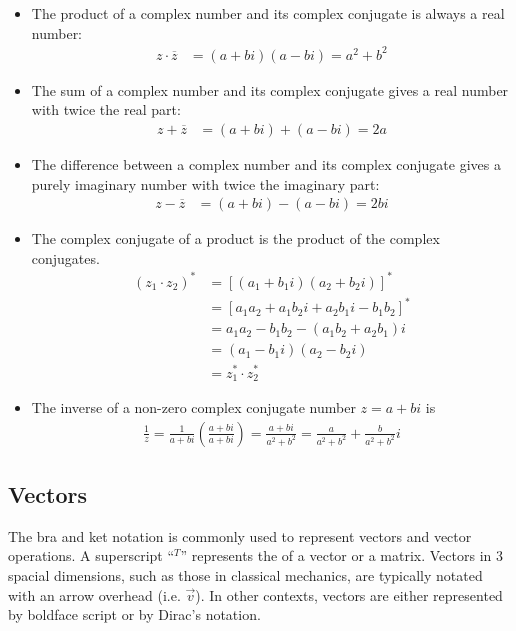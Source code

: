 \begin{itemize}
	\item The product of a complex number and its complex conjugate is always a real number:
	\begin{align}
		z \cdot \overline{z} &= (a+bi)(a-bi) = a^2 + b^2
	\end{align}
	
	\item The sum of a complex number and its complex conjugate gives a real number with twice the real part:
	\begin{align}
		z + \overline{z} &= (a+bi) + (a-bi) = 2a
	\end{align}
	
	\item The difference between a complex number and its complex conjugate gives a purely imaginary number with twice the imaginary part:
	\begin{align}
		z - \overline{z} &= (a+bi) - (a-bi) = 2bi
	\end{align}

	\item The complex conjugate of a product is the product of the complex conjugates.
	\begin{align}
		(z_1 \cdot z_2)^* &= [(a_1+b_1i)(a_2+b_2i)]^* \\ &= [a_1a_2+a_1b_2i+a_2b_1i-b_1b_2]^* \\ &= a_1a_2-b_1b_2 - (a_1b_2+a_2b_1)i \\ &= (a_1-b_1i)(a_2-b_2i) \\
		&= z_1^* \cdot z_2^*
	\end{align}

	\item The inverse of a non-zero complex conjugate number $z=a+bi$ is
	\begin{align}
		\frac{1}{z} = \frac{1}{a+bi}\left(\frac{a+bi}{a+bi}\right) = \frac{a+bi}{a^2+b^2} = \frac{a}{a^2+b^2} + \frac{b}{a^2+b^2}i
	\end{align}
\end{itemize}

\subsection{Vectors}

The bra and ket notation is commonly used to represent vectors and vector operations. A superscript ``$^T$'' represents the  of a vector or a matrix. Vectors in 3 spacial dimensions, such as those in classical mechanics, are typically notated with an arrow overhead (i.e. $\vec{v}$). In other contexts, vectors are either represented by boldface script or by Dirac's  notation. 

